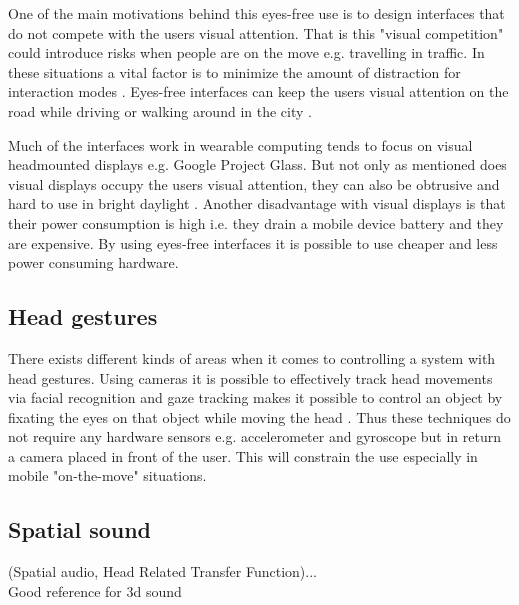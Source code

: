 One of the main motivations behind this eyes-free use is to design interfaces that do not compete with the users visual attention. That is this "visual competition" could introduce risks when people are on the move e.g. travelling in traffic. In these situations a vital factor is to minimize the amount of distraction for interaction modes \cite{pascoe_using_2000}. Eyes-free interfaces can keep the users visual attention on the road while driving \cite{sodnik_user_2008} or walking around in the city \cite{vazquez-alvarez_eyes-free_2011}.

Much of the interfaces work in wearable computing tends to focus on visual headmounted displays \cite{barfield_fundamentals_2000} e.g. Google Project Glass. But not only as mentioned does visual displays occupy the users visual attention, they can also be obtrusive and hard to use in bright daylight \cite{geelhoed_safety_2000}. Another disadvantage with visual displays is that their power consumption is high i.e. they drain a mobile device battery and they are expensive. By using eyes-free interfaces it is possible to use cheaper and less power consuming hardware.

\subsection{Head gestures}
There exists different kinds of areas when it comes to controlling a system with head gestures. Using cameras it is possible to effectively track head movements via facial recognition \cite{morimoto_recognition_1996} and gaze tracking makes it possible to control an object by fixating the eyes on that object while moving the head \cite{mardanbegi_eye-based_2012}. Thus these techniques do not require any hardware sensors e.g. accelerometer and gyroscope but in return a camera placed in front of the user. This will constrain the use especially in mobile "on-the-move" situations.


\subsection{Spatial sound}
(Spatial audio, Head Related Transfer Function)...\\
Good reference for 3d sound \cite{begault_3dd_1994}

